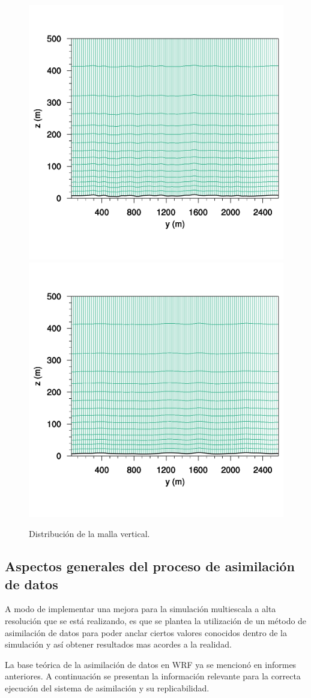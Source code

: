 \begin{figure}[H]
	\includegraphics[width=0.5\linewidth,trim={0cm 4cm -2cm 4cm},clip]{Imagenes/05/hov_mesh_y000066}%
	\includegraphics[width=0.5\linewidth,trim={0cm 4cm -2cm 4cm},clip]{Imagenes/05/hov_mesh_y000101}%
	
	\caption{Distribución de la malla vertical.}
	\label{fig:c1_mesh}
\end{figure}

\subsection{Aspectos generales del proceso de asimilación de datos}
A modo de implementar una mejora para la simulación multiescala a alta resolución que se está realizando, es que se plantea la utilización de un método de asimilación de datos para poder anclar ciertos valores conocidos dentro de la simulación y así obtener resultados mas acordes a la realidad.

La base teórica de la asimilación de datos en WRF ya se mencionó en informes anteriores. A continuación se presentan la información relevante para la correcta ejecución del sistema de asimilación y su replicabilidad.

